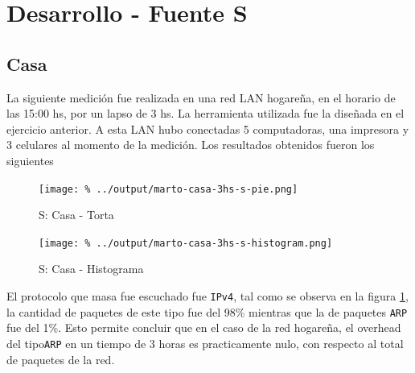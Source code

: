 \documentclass[final,narroweqnarray,inline]{ieee}
\begin{document}
\section{Desarrollo - Fuente S}
  \subsection{Casa}

  La siguiente medición fue realizada en una red LAN hogareña, en el horario
  de las 15:00 hs, por un lapso de 3 hs. La herramienta utilizada fue la
  diseñada en el ejercicio anterior. A esta LAN hubo conectadas 5 computadoras,
  una impresora y 3 celulares al momento de la medición. Los resultados obtenidos
  fueron los siguientes


    \begin{figure}[H]\begin{center}
      \texttt{[image: \%
      ../output/marto-casa-3hs-s-pie.png]}
      \vspace{-3em}
      \caption{S: Casa - Torta}
      \label{marto-casa-3hs-s-pie}
    \end{center}\end{figure}

    
    \begin{figure}[H]\begin{center}
     \texttt{[image: \%
      ../output/marto-casa-3hs-s-histogram.png]}
      \caption{S: Casa - Histograma}
      \label{marto-casa-3hs-s-histogram}
    \end{center}\end{figure}

    El protocolo que masa fue escuchado fue \texttt{IPv4}, tal como se
    observa en la figura \ref{marto-casa-3hs-s-pie}, la cantidad de
    paquetes  de este tipo fue del 98\% mientras que la de paquetes
    \texttt{ARP} fue del 1\%. Esto permite concluir que en el caso de
    la red hogareña, el overhead del tipo\texttt{ARP} en un tiempo
    de 3 horas es practicamente nulo, con respecto al total de
    paquetes de la red.
\end{document}
